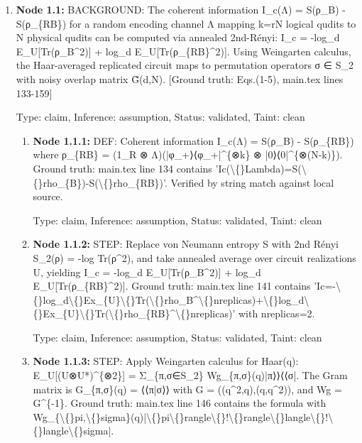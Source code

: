 \documentclass{article}
\begin{document}
\begin{enumerate}
\item \textbf{Node 1.1:} BACKGROUND: The coherent information I\_c(Λ) = S(ρ\_B) - S(ρ\_\{RB\}) for a random encoding channel Λ mapping k=rN logical qudits to N physical qudits can be computed via annealed 2nd-Rényi: I\_c = -log\_d E\_U[Tr(ρ\_B\textasciicircum{}2)] + log\_d E\_U[Tr(ρ\_\{RB\}\textasciicircum{}2)]. Using Weingarten calculus, the Haar-averaged replicated circuit maps to permutation operators σ ∈ S\_2 with noisy overlap matrix G̃(d,N). [Ground truth: Eqs.(1-5), main.tex lines 133-159]

  Type: claim, Inference: assumption, Status: validated, Taint: clean

\begin{enumerate}
\item \textbf{Node 1.1.1:} DEF: Coherent information I\_c(Λ) = S(ρ\_B) - S(ρ\_\{RB\}) where ρ\_\{RB\} = (1\_R ⊗ Λ)(|φ\_+⟩⟨φ\_+|\textasciicircum{}\{⊗k\} ⊗ |0⟩⟨0|\textasciicircum{}\{⊗(N-k)\}). Ground truth: main.tex line 134 contains 'Ic(\textbackslash\{\}Lambda)=S(\textbackslash\{\}rho\_\{B\})-S(\textbackslash\{\}rho\_\{RB\})'. Verified by string match against local source.

  Type: claim, Inference: assumption, Status: validated, Taint: clean

\item \textbf{Node 1.1.2:} STEP: Replace von Neumann entropy S with 2nd Rényi S\_2(ρ) = -log Tr(ρ\textasciicircum{}2), and take annealed average over circuit realizations U, yielding I\_c = -log\_d E\_U[Tr(ρ\_B\textasciicircum{}2)] + log\_d E\_U[Tr(ρ\_\{RB\}\textasciicircum{}2)]. Ground truth: main.tex line 141 contains 'Ic=-\textbackslash\{\}log\_d\textbackslash\{\}Ex\_\{U\}\textbackslash\{\}Tr(\textbackslash\{\}rho\_B\textasciicircum{}\textbackslash\{\}nreplicas)+\textbackslash\{\}log\_d\textbackslash\{\}Ex\_\{U\}\textbackslash\{\}Tr(\textbackslash\{\}rho\_\{RB\}\textasciicircum{}\textbackslash\{\}nreplicas)' with nreplicas=2.

  Type: claim, Inference: assumption, Status: validated, Taint: clean

\item \textbf{Node 1.1.3:} STEP: Apply Weingarten calculus for Haar(q): E\_U[(U⊗U*)\textasciicircum{}\{⊗2\}] = Σ\_\{π,σ∈S\_2\} Wg\_\{π,σ\}(q)|π⟩⟩⟨⟨σ|. The Gram matrix is G\_\{π,σ\}(q) = ⟨⟨π|σ⟩⟩ with G = ((q\textasciicircum{}2,q),(q,q\textasciicircum{}2)), and Wg = G\textasciicircum{}\{-1\}. Ground truth: main.tex line 146 contains the formula with Wg\_\{\textbackslash\{\}pi,\textbackslash\{\}sigma\}(q)|\textbackslash\{\}pi\textbackslash\{\}rangle\textbackslash\{\}!\textbackslash\{\}rangle\textbackslash\{\}langle\textbackslash\{\}!\textbackslash\{\}langle\textbackslash\{\}sigma|.


\end{enumerate}
\end{enumerate}
\end{document}
